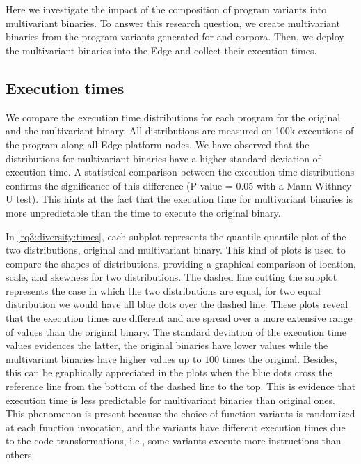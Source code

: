 \section{\rqthree}
\label{results:rq3}

Here we investigate the impact of the composition of program variants into multivariant binaries.
To answer this research question, we create multivariant binaries from the program variants generated for \corpussodium and \corpusqrcode corpora. Then, we deploy the multivariant binaries into the Edge and collect their execution times. 

\subsection{Execution times}


We compare the execution time distributions for each program for the original and the multivariant binary. All distributions are measured on 100k executions of the program along all Edge platform nodes.
We have observed that the distributions for multivariant binaries have a higher standard deviation of execution time.
A statistical comparison between the execution time distributions confirms the significance of this difference (P-value = 0.05 with a  Mann-Withney U test). This hints at the fact that the execution time for multivariant binaries is more unpredictable than the time to execute the original binary. 


In \autoref{rq3:diversity:times}, each subplot represents the quantile-quantile plot \cite{gnanadesikan1968probability} of the two distributions, original and multivariant binary.
This kind of plots is used to compare the shapes of distributions, providing a graphical comparison of location, scale, and skewness for two distributions.
The dashed line cutting the subplot represents the case in which the two distributions are equal, \ie for two equal distribution we would have all blue dots over the dashed line. These plots reveal that the execution times are different and are spread over a more extensive range of values than the original binary.
The standard deviation of the execution time values evidences the latter, the original binaries have lower values while the multivariant binaries have higher values up to $100$ times the original. Besides, this can be graphically appreciated in the plots when the blue dots cross the reference line from the bottom of the dashed line to the top.
This is evidence that execution time is less predictable for multivariant binaries than original ones.
This phenomenon is present because the choice of function variants is randomized at each function invocation, and the variants have different execution times due to the code transformations, i.e., some variants execute more instructions than others. 
 

